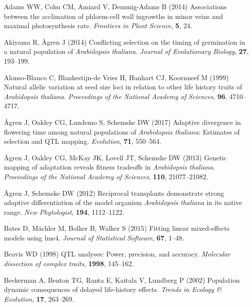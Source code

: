 \documentclass[
]{article}
\begin{document}
\hypertarget{refs}{}
\leavevmode\hypertarget{ref-adams2014associations}{}%
Adams WW, Cohu CM, Amiard V, Demmig-Adams B (2014) Associations between the acclimation of phloem-cell wall ingrowths in minor veins and maximal photosynthesis rate. \emph{Frontiers in Plant Science}, \textbf{5}, 24.

\leavevmode\hypertarget{ref-akiyama2014conflicting}{}%
Akiyama R, Ågren J (2014) Conflicting selection on the timing of germination in a natural population of \emph{Arabidopsis thaliana}. \emph{Journal of Evolutionary Biology}, \textbf{27}, 193--199.

\leavevmode\hypertarget{ref-alonso1999natural}{}%
Alonso-Blanco C, Blankestijn-de Vries H, Hanhart CJ, Koornneef M (1999) Natural allelic variation at seed size loci in relation to other life history traits of \emph{Arabidopsis thaliana}. \emph{Proceedings of the National Academy of Sciences}, \textbf{96}, 4710--4717.

\leavevmode\hypertarget{ref-agren_flowering_time}{}%
Ågren J, Oakley CG, Lundemo S, Schemske DW (2017) Adaptive divergence in flowering time among natural populations of \emph{Arabidopsis thaliana}: Estimates of selection and QTL mapping. \emph{Evolution}, \textbf{71}, 550--564.

\leavevmode\hypertarget{ref-agren_genetic_2013}{}%
Ågren J, Oakley CG, McKay JK, Lovell JT, Schemske DW (2013) Genetic mapping of adaptation reveals fitness tradeoffs in \emph{Arabidopsis thaliana}. \emph{Proceedings of the National Academy of Sciences}, \textbf{110}, 21077--21082.

\leavevmode\hypertarget{ref-agren_reciprocal_2012}{}%
Ågren J, Schemske DW (2012) Reciprocal transplants demonstrate strong adaptive differentiation of the model organism \emph{Arabidopsis thaliana} in its native range. \emph{New Phytologist}, \textbf{194}, 1112--1122.

\leavevmode\hypertarget{ref-bates2015}{}%
Bates D, Mächler M, Bolker B, Walker S (2015) Fitting linear mixed-effects models using lme4. \emph{Journal of Statistical Software}, \textbf{67}, 1--48.

\leavevmode\hypertarget{ref-beavis1998qtl}{}%
Beavis WD (1998) QTL analyses: Power, precision, and accuracy. \emph{Molecular dissection of complex traits}, \textbf{1998}, 145--162.

\leavevmode\hypertarget{ref-beckerman2002population}{}%
Beckerman A, Benton TG, Ranta E, Kaitala V, Lundberg P (2002) Population dynamic consequences of delayed life-history effects. \emph{Trends in Ecology \& Evolution}, \textbf{17}, 263--269.
\end{document}
